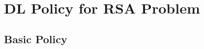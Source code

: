 \documentclass[english,aspectratio=169,dvipsnames]{beamer}
\begin{document}


%         



%         


\section{DL Policy for RSA Problem}

\subsection{Basic Policy}

%         


\end{document}
